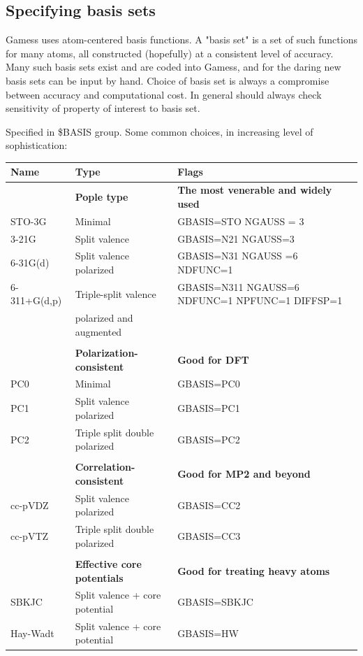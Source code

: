 \documentclass[11pt]{article}
\begin{document}
\subsection{Specifying basis sets}
\label{sec-7-3}
Gamess uses atom-centered basis functions.  A "basis set" is a set of such functions for many atoms, all constructed (hopefully) at a consistent level of accuracy. Many such basis sets exist and are coded into Gamess, and for the daring new basis sets can be input by hand.  Choice of basis set is always a compromise between accuracy and computational cost.  In general should always check sensitivity of property of interest to basis set.

Specified in \$BASIS group.  Some common choices, in increasing level of sophistication:

\begin{center}
\begin{tabular}{lll}
\hline
Name & Type & Flags\\
\hline
 & \textbf{Pople type} & \textbf{The most venerable and widely used}\\
STO-3G & Minimal & GBASIS=STO  NGAUSS = 3\\
3-21G & Split valence & GBASIS=N21  NGAUSS=3\\
6-31G(d) & Split valence polarized & GBASIS=N31 NGAUSS =6 NDFUNC=1\\
6-311+G(d,p) & Triple-split valence & GBASIS=N311 NGAUSS=6 NDFUNC=1 NPFUNC=1 DIFFSP=1\\
 & polarized and augmented & \\
 &  & \\
 & \textbf{Polarization-consistent} & \textbf{Good for DFT}\\
PC0 & Minimal & GBASIS=PC0\\
PC1 & Split valence polarized & GBASIS=PC1\\
PC2 & Triple split double polarized & GBASIS=PC2\\
 &  & \\
 & \textbf{Correlation-consistent} & \textbf{Good for MP2 and beyond}\\
cc-pVDZ & Split valence polarized & GBASIS=CC2\\
cc-pVTZ & Triple split double polarized & GBASIS=CC3\\
 &  & \\
 & \textbf{Effective core potentials} & \textbf{Good for treating heavy atoms}\\
SBKJC & Split valence + core potential & GBASIS=SBKJC\\
Hay-Wadt & Split valence + core potential & GBASIS=HW\\
\hline
\end{tabular}
\end{center}
\end{document}
